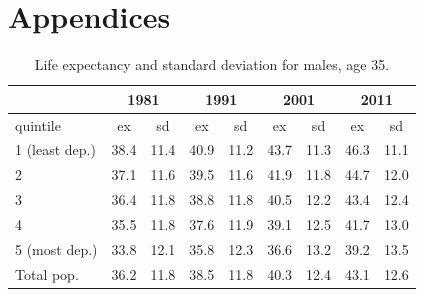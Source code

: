 \documentclass[12pt,oneside,a4paper]{article} %
\theoremstyle{definition}
\begin{document}




\section{Appendices}
\begin{table}[htbp]
  \centering
  \caption{Life expectancy and standard deviation for males, age 35.}
    \begin{tabular}{lrrrrrrrr}
          & \multicolumn{2}{c}{1981} & \multicolumn{2}{c}{1991} & \multicolumn{2}{c}{2001} & \multicolumn{2}{c}{2011} \\
    \midrule
    quintile & \multicolumn{1}{c}{ex} & \multicolumn{1}{c}{sd} & \multicolumn{1}{c}{ex} & \multicolumn{1}{c}{sd} & \multicolumn{1}{c}{ex} & \multicolumn{1}{c}{sd} & \multicolumn{1}{c}{ex} & \multicolumn{1}{c}{sd} \\
    \midrule
    1 (least dep.) & 38.4  & 11.4  & 40.9  & 11.2  & 43.7  & 11.3  & 46.3  & 11.1 \\
    2     & 37.1  & 11.6  & 39.5  & 11.6  & 41.9  & 11.8  & 44.7  & 12.0 \\
    3     & 36.4  & 11.8  & 38.8  & 11.8  & 40.5  & 12.2  & 43.4  & 12.4 \\
    4     & 35.5  & 11.8  & 37.6  & 11.9  & 39.1  & 12.5  & 41.7  & 13.0 \\
    5 (most dep.) & 33.8  & 12.1  & 35.8  & 12.3  & 36.6  & 13.2  & 39.2  & 13.5 \\
    Total pop. & 36.2  & 11.8  & 38.5  & 11.8  & 40.3  & 12.4  & 43.1  & 12.6 \\
    \bottomrule
    \end{tabular}%
  \label{tab:addlabel}%
\end{table}%
\end{document}
